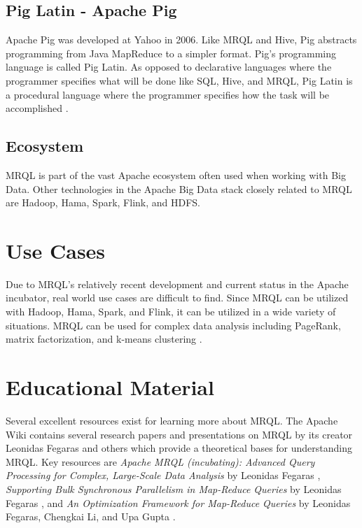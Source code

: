\documentclass[9pt,twocolumn,twoside]{../../styles/osajnl}
\begin{document}
\subsection{Pig Latin - Apache Pig}

Apache Pig was developed at Yahoo in 2006.  Like MRQL and Hive, Pig abstracts programming from Java MapReduce to a simpler format.  Pig's programming language is called Pig Latin.  As opposed to declarative languages where the programmer specifies what will be done like SQL, Hive, and MRQL, Pig Latin is a procedural language where the programmer specifies how the task will be accomplished \cite{www-wikipig}.


\subsection{Ecosystem}

MRQL is part of the vast Apache ecosystem often used when working with Big Data.  Other technologies in the Apache Big Data stack closely related to MRQL are Hadoop, Hama, Spark, Flink, and HDFS.

\section{Use Cases}

Due to MRQL's relatively recent development and current status in the Apache incubator, real world use cases are difficult to find.  Since MRQL can be utilized with Hadoop, Hama, Spark, and Flink, it can be utilized in a wide variety of situations.  MRQL can be used for complex data analysis including PageRank, matrix factorization, and k-means clustering \cite{www-apacheincubator}.

\section{Educational Material}

Several excellent resources exist for learning more about MRQL.  The Apache Wiki contains several research papers and presentations on MRQL by its creator Leonidas Fegaras and others \cite{www-wikiapache} which provide a theoretical bases for understanding MRQL.  Key resources are \emph{Apache MRQL (incubating): Advanced Query Processing for Complex, Large-Scale Data Analysis} by Leonidas Fegaras \cite{www-mrqpresent}, \emph{Supporting Bulk Synchronous Parallelism in Map-Reduce Queries} by Leonidas Fegaras \cite{wikibsp}, and \emph{An Optimization Framework for Map-Reduce Queries} by Leonidas Fegaras, Chengkai Li, and Upa Gupta \cite{wikiopt}.
\end{document}
